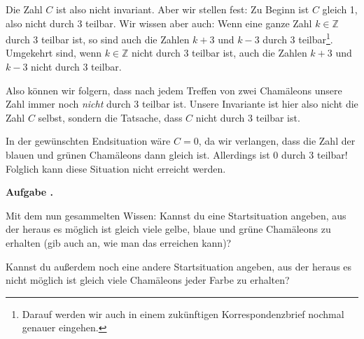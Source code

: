 \documentclass[a4paper,ngerman,12pt]{scrartcl}
\newcommand{\ZZ}{\mathbb{Z}}
\theoremstyle{definition}
\theoremstyle{plain}
\theoremstyle{remark}
\newlength{\aufgabenskip}
\newcounter{aufgabennummer}
\newenvironment{aufgabe}[1]{
	\addtocounter{aufgabennummer}{1}
	\textbf{Aufgabe \theaufgabennummer.} \emph{#1} \par
}{\vspace{\aufgabenskip}}
\begin{document}
Die Zahl $C$ ist also nicht invariant. Aber wir stellen fest: Zu Beginn ist $C$ gleich 1, also nicht durch 3 teilbar. Wir wissen aber auch: Wenn eine ganze Zahl $k \in \ZZ$ durch 3 teilbar ist, so sind auch die Zahlen $k + 3$ und $k - 3$ durch 3 teilbar\footnote{Darauf werden wir auch in einem zukünftigen Korrespondenzbrief nochmal genauer eingehen.}. Umgekehrt sind, wenn $k \in \ZZ$ nicht durch 3 teilbar ist, auch die Zahlen $k + 3$ und $k - 3$ nicht durch 3 teilbar. 

Also können wir folgern, dass nach jedem Treffen von zwei Chamäleons unsere Zahl immer noch \emph{nicht} durch 3 teilbar ist. Unsere Invariante ist hier also nicht die Zahl $C$ selbst, sondern die Tatsache, dass $C$ nicht durch 3 teilbar ist. 

In der gewünschten Endsituation wäre $C = 0$, da wir verlangen, dass die Zahl der blauen und grünen Chamäleons dann gleich ist. Allerdings ist $0$ durch $3$ teilbar! Folglich kann diese Situation nicht erreicht werden.

\begin{aufgabe}{}
	Mit dem nun gesammelten Wissen: Kannst du eine Startsituation angeben, aus der heraus es möglich ist gleich viele gelbe, blaue und grüne Chamäleons zu erhalten (gib auch an, wie man das erreichen kann)?
	
	Kannst du außerdem noch eine andere Startsituation angeben, aus der heraus es nicht möglich ist gleich viele Chamäleons jeder Farbe zu erhalten?
\end{aufgabe}
\end{document}
